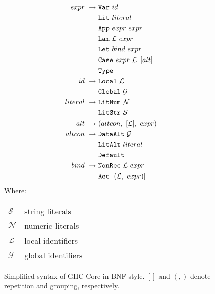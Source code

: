 \begin{figure}
  \begin{equation*}
    \begin{split}
      expr\    \rightarrow\ & \CVar\ id                                       \\
                         |\ & \CLit\ literal                                  \\
                         |\ & \CApp\ expr\ expr                               \\
                         |\ & \CLam\ \mathcal{L}\ expr                        \\
                         |\ & \CLet\ bind\ expr                               \\
                         |\ & \CCase\ expr\ \mathcal{L}\ \left[ alt \right]   \\
                         |\ & \CType                                          \\
      id\      \rightarrow\ & \CLocal\ \mathcal{L}                            \\
                         |\ & \CGlobal\ \mathcal{G}                           \\
      literal\ \rightarrow\ & \CLitNum\ \mathcal{N}                           \\
                         |\ & \CLitStr\ \mathcal{S}                           \\
      alt\     \rightarrow\ & ( altcon,\ [\mathcal{L}],\ expr )               \\
      altcon\  \rightarrow\ & \CDataAlt\ \mathcal{G}                          \\
                         |\ & \CLitAlt\ literal                               \\
                         |\ & \CDefault                                       \\
      bind\    \rightarrow\ & \CNonRec\ \mathcal{L}\ expr                     \\
                         |\ & \CRec\ [ ( \mathcal{L},\ expr ) ]
    \end{split}
  \end{equation*}
  Where:
  \begin{tabular}[t]{l @{ $=$ } l}
    $\mathcal{S}$ & string literals    \\
    $\mathcal{N}$ & numeric literals   \\
    $\mathcal{L}$ & local identifiers  \\
    $\mathcal{G}$ & global identifiers
  \end{tabular}

  \caption{Simplified syntax of GHC Core in BNF style. $[]$ and $(,)$ denote repetition and grouping, respectively.}
  \label{fig:coresyntax}
\end{figure}

